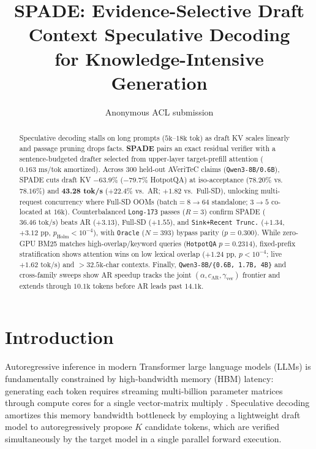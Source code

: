 \documentclass[11pt]{article}
\title{\textbf{SPADE: Evidence-Selective Draft Context Speculative Decoding\\for Knowledge-Intensive Generation}}
\author{Anonymous ACL submission}
\date{}
\begin{document}
\maketitle

\begin{abstract}
Speculative decoding stalls on long prompts ($5\text{k}$--$18\text{k}$ tok) as draft KV scales linearly and passage pruning drops facts. \textbf{SPADE} pairs an exact residual verifier with a sentence-budgeted drafter selected from upper-layer target-prefill attention ($0.163\text{ ms/tok}$ amortized). Across $300$ held-out AVeriTeC claims (\texttt{Qwen3-8B/0.6B}), SPADE cuts draft KV \textbf{$-63.9\%$} ($-79.7\%$ HotpotQA) at iso-acceptance ($78.20\%$ vs.\ $78.16\%$) and \textbf{43.28 tok/s} ($+22.4\%$ vs.\ AR; $+1.82$ vs.\ Full-SD), unlocking multi-request concurrency where Full-SD OOMs ($\text{batch}=8\to 64$ standalone; $3\to 5$ co-located at $16\text{k}$). Counterbalanced \texttt{Long-173} passes ($R=3$) confirm SPADE ($36.46\text{ tok/s}$) beats AR ($+3.13$), Full-SD ($+1.55$), and \texttt{Sink+Recent Trunc.} ($+1.34$, $+3.12\text{ pp}$, $p_{\text{Holm}}<10^{-4}$), with \texttt{Oracle} ($N=393$) bypass parity ($p=0.300$). While zero-GPU BM25 matches high-overlap/keyword queries (\texttt{HotpotQA} $p=0.2314$), fixed-prefix stratification shows attention wins on low lexical overlap ($+1.24\text{ pp}$, $p<10^{-4}$; live $+1.62\text{ tok/s}$) and $>32.5\text{k}$-char contexts. Finally, \texttt{Qwen3-8B/\{0.6B, 1.7B, 4B\}} and cross-family sweeps show AR speedup tracks the joint $(\alpha, c_{\text{AR}}, \gamma_{\text{ver}})$ frontier and extends through $10.1\text{k}$ tokens before AR leads past $14.1\text{k}$.
\end{abstract}

\section{Introduction}
\label{sec:intro}

Autoregressive inference in modern Transformer large language models (LLMs) is fundamentally constrained by high-bandwidth memory (HBM) latency: generating each token requires streaming multi-billion parameter matrices through compute cores for a single vector-matrix multiply \citep{shazeer2019fast,leviathan2023fast,chen2023accelerating}. Speculative decoding amortizes this memory bandwidth bottleneck by employing a lightweight draft model to autoregressively propose $K$ candidate tokens, which are verified simultaneously by the target model in a single parallel forward execution.
\end{document}

